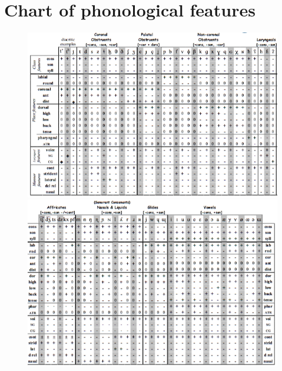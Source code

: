 \documentclass[11pt, oneside]{article}   	%
\begin{document}
\section{Chart of phonological features}

\thispagestyle{empty}

\begin{figure}[H]
\centering
\includegraphics[scale=0.75]{chart_features_1}
\includegraphics[scale=0.75]{chart_features_2}
\end{figure}
\end{document}
